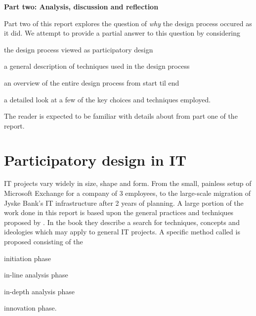 \setcounter{section}{0}
\setcounter{figure}{0}
\setcounter{table}{0}
\newpage
\textbf{\LARGE{{Part two: Analysis, discussion and reflection}}}\\


Part two of this report explores the question of \textit{why}
the design process occured as it did. We attempt to provide a
partial answer to this question by considering
\begin{inparaenum}[1)]
\item the design process viewed as participatory design
\item a general description of techniques used in the design process
\item an overview of the entire design process from start til end
\item a detailed look at a few of the key choices and techniques employed.
\end{inparaenum}

The reader is expected to be familiar with details about \gomonkey{} 
from part one of the report.

\section{Participatory design in IT}

IT projects vary widely in size, shape and form. From the small, painless setup of
Microsoft Exchange for a company of 3 employees, to the large-scale migration of
Jyske Bank's IT infrastructure after 2 years of planning\cite{jyskebank}.
A large portion of the work done in this report is based upon the general
practices and techniques proposed by \cite{bodker2004participatory}. In the book
they describe a search for techniques, concepts and ideologies which may apply
to general IT projects. A specific method called \must{}
is proposed consisting of the
\begin{inparaenum}[1)]
\item initiation phase
\item in-line analysis phase
\item in-depth analysis phase
\item innovation phase.
\end{inparaenum}

